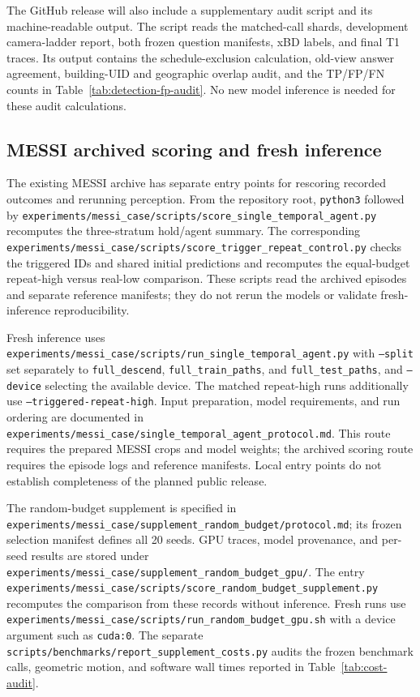 The GitHub release will also include a supplementary audit script and its machine-readable output. The script reads the matched-call shards, development camera-ladder report, both frozen question manifests, xBD labels, and final T1 traces. Its output contains the schedule-exclusion calculation, old-view answer agreement, building-UID and geographic overlap audit, and the TP/FP/FN counts in Table~\ref{tab:detection-fp-audit}. No new model inference is needed for these audit calculations.


\subsection{MESSI archived scoring and fresh inference}
The existing MESSI archive has separate entry points for rescoring recorded outcomes and rerunning perception. From the repository root, \texttt{python3} followed by \nolinkurl{experiments/messi_case/scripts/score_single_temporal_agent.py} recomputes the three-stratum hold/agent summary. The corresponding \nolinkurl{experiments/messi_case/scripts/score_trigger_repeat_control.py} checks the triggered IDs and shared initial predictions and recomputes the equal-budget repeat-high versus real-low comparison. These scripts read the archived episodes and separate reference manifests; they do not rerun the models or validate fresh-inference reproducibility.

Fresh inference uses \nolinkurl{experiments/messi_case/scripts/run_single_temporal_agent.py} with \texttt{--split} set separately to \texttt{full\_descend}, \texttt{full\_train\_paths}, and \texttt{full\_test\_paths}, and \texttt{--device} selecting the available device. The matched repeat-high runs additionally use \texttt{--triggered-repeat-high}. Input preparation, model requirements, and run ordering are documented in \nolinkurl{experiments/messi_case/single_temporal_agent_protocol.md}. This route requires the prepared MESSI crops and model weights; the archived scoring route requires the episode logs and reference manifests. Local entry points do not establish completeness of the planned public release.


The random-budget supplement is specified in \nolinkurl{experiments/messi_case/supplement_random_budget/protocol.md}; its frozen selection manifest defines all 20 seeds. GPU traces, model provenance, and per-seed results are stored under \nolinkurl{experiments/messi_case/supplement_random_budget_gpu/}. The entry \nolinkurl{experiments/messi_case/scripts/score_random_budget_supplement.py} recomputes the comparison from these records without inference. Fresh runs use \nolinkurl{experiments/messi_case/scripts/run_random_budget_gpu.sh} with a device argument such as \texttt{cuda:0}. The separate \nolinkurl{scripts/benchmarks/report_supplement_costs.py} audits the frozen benchmark calls, geometric motion, and software wall times reported in Table~\ref{tab:cost-audit}.
